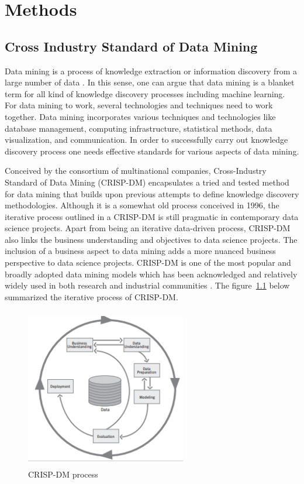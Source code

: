 \chapter{Methods}
\label{chapter:methods}

\section{Cross Industry Standard of Data Mining}
Data mining is a process of knowledge extraction or information discovery from a large number of data \citep{kurgan2006survey}. In this sense, one can argue that data mining is a blanket term for all kind of knowledge discovery processes including machine learning. For data mining to work, several technologies and techniques need to work together. Data mining incorporates various techniques and technologies like database management, computing infrastructure, statistical methods, data visualization, and communication. In order to successfully carry out knowledge discovery process one needs effective standards for various aspects of data mining.
 
Conceived by the consortium of multinational companies, Cross-Industry Standard of Data Mining (CRISP-DM) encapsulates a tried and tested method for data mining that builds upon previous attempts to define knowledge discovery methodologies. Although it is a somewhat old process conceived in 1996, the iterative process outlined in a CRISP-DM is still pragmatic in contemporary data science projects. Apart from being an iterative data-driven process, CRISP-DM also links the business understanding and objectives to data science projects. The inclusion of a business aspect to data mining adds a more nuanced business perspective to data science projects. CRISP-DM is one of the most popular and broadly adopted data mining models which has been acknowledged and relatively widely used in both research and industrial communities \citep{kurgan2006survey}. The figure~\ref{fig:Crisp process} below summarized the iterative process of CRISP-DM.

\begin{figure}[ht]
	\begin{center}
		\includegraphics[width=7cm,height=7cm,keepaspectratio]{images/new_crisp.png}
		\caption{CRISP-DM process}
		\label{fig:Crisp process}
	\end{center}
\end{figure} 


